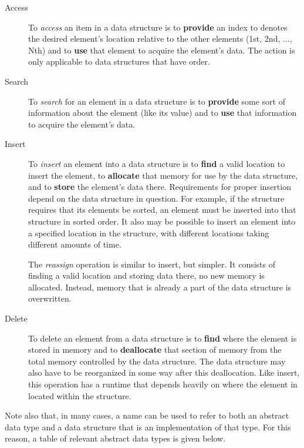 \begin{description}
    \item[Access] To \textit{access} an item in a data structure is to \textbf{provide} an index to denotes the desired element's location relative to the other elements (1st, 2nd, ..., Nth) and to \textbf{use} that element to acquire the element's data. The action is only applicable to data structures that have order.
    \item[Search] To \textit{search} for an element in a data structure is to \textbf{provide} some sort of information about the element (like its value) and to \textbf{use} that information to acquire the element's data.
    \item[Insert] To \textit{insert} an element into a data structure is to \textbf{find} a valid location to insert the element, to \textbf{allocate} that memory for use by the data structure, and to \textbf{store} the element's data there. Requirements for proper insertion depend on the data structure in question. For example, if the structure requires that its elements be sorted, an element must be inserted into that structure in sorted order. It also may be possible to insert an element into a specified location in the structure, with different locations taking different amounts of time.

    The \textit{reassign} operation is similar to insert, but simpler. It consists of finding a valid location and storing data there, no new memory is allocated. Instead, memory that is already a part of the data structure is overwritten.
    \item[Delete] To delete an element from a data structure is to \textbf{find} where the element is stored in memory and to \textbf{deallocate} that section of memory from the total memory controlled by the data structure. The data structure may also have to be reorganized in some way after this deallocation. Like insert, this operation has a runtime that depends heavily on where the element in located within the structure.
\end{description}
\vspace{5mm}

Note also that, in many cases, a name can be used to refer to both an abstract data type and a data structure that is an implementation of that type. For this reason, a table of relevant abstract data types is given below.


